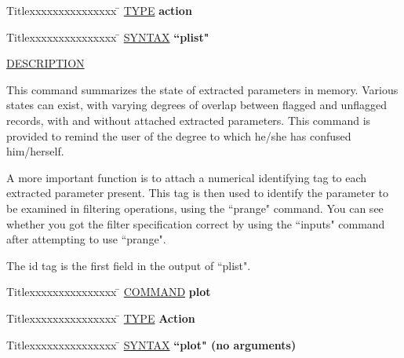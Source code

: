\begin{tabbing}
Titlexxxxxxxxxxxxxxx \= \kill
\underline{TYPE} \> {\bf 		action} \\
\end{tabbing}

\begin{tabbing}
Titlexxxxxxxxxxxxxxx \= \kill
\underline{SYNTAX} \> {\bf 		``plist"} \\
\end{tabbing}

\underline{DESCRIPTION}
\begin{list}{}{\setlength{\leftmargin}{0.5in}
     \setlength{\rightmargin}{0in}}
\item
This command summarizes the state of extracted parameters in memory.  Various
states can exist, with varying degrees of overlap between flagged and unflagged
records, with and without attached extracted parameters.  This command is
provided to remind the user of the degree to which he/she has confused
him/herself.
\item
A more important function is to attach a numerical identifying tag to each
extracted parameter present.  This tag is then used to identify the parameter
to be examined in filtering operations, using the ``prange" command.  You can
see whether you got the filter specification correct by using the ``inputs"
command after attempting to use ``prange".
\item
The id tag is the first field in the output of ``plist".
\end{list}
\vspace{.2in}

\begin{tabbing}
Titlexxxxxxxxxxxxxxx \= \kill
\underline{COMMAND} \> {\bf 	plot} \\
\end{tabbing}

\begin{tabbing}
Titlexxxxxxxxxxxxxxx \= \kill
\underline{TYPE} \> {\bf 		Action} \\
\end{tabbing}

\begin{tabbing}
Titlexxxxxxxxxxxxxxx \= \kill
\underline{SYNTAX} \> {\bf 		``plot" (no arguments)} \\
\end{tabbing}

